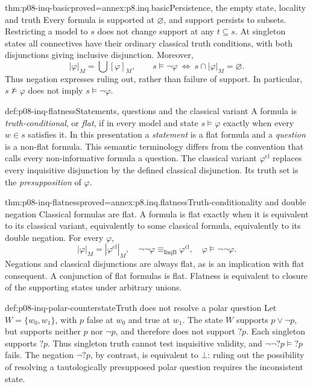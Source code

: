 \begin{hblemma}{thm:p08-inq-basic}{proved=annex:p8.inq.basic}{Persistence, the empty state, locality and truth}
Every formula is supported at \(\varnothing\), and support persists to subsets.
Restricting a model to \(s\) does not change support at any \(t\subseteq s\).
At singleton states all connectives have their ordinary classical truth
conditions, with both disjunctions giving inclusive disjunction.
Moreover,
\[
 |\varphi|_M=\bigcup[\varphi]_M,
 \qquad
 s\models\neg\varphi\ \Longleftrightarrow\ s\cap|\varphi|_M=\varnothing.
\]
Thus negation expresses ruling out, rather than failure of support. In
particular, \(s\not\models\varphi\) does not imply
\(s\models\neg\varphi\).
\end{hblemma}

\begin{hbdefinition}{def:p08-inq-flatness}{Statements, questions and the classical variant}
A formula is \emph{truth-conditional}, or \emph{flat}, if in every model and state
\(s\models\varphi\) exactly when every \(w\in s\) satisfies it.
In this presentation a \emph{statement} is a flat formula and a
\emph{question} is a non-flat formula. This semantic terminology differs
from the convention that calls every non-informative formula a question.
The classical variant \(\varphi^{\mathrm{cl}}\) replaces every inquisitive
disjunction by the defined classical disjunction. Its truth set is the
\emph{presupposition} of \(\varphi\).
\end{hbdefinition}

\begin{hblemma}{thm:p08-inq-flatness}{proved=annex:p8.inq.flatness}{Truth-conditionality and double negation}
Classical formulas are flat. A formula is flat exactly when it is equivalent
to its classical variant, equivalently to some classical formula, equivalently
to its double negation. For every \(\varphi\),
\[
 |\varphi|_M=|\varphi^{\mathrm{cl}}|_M,
 \quad\neg\neg\varphi\equiv_{\mathrm{InqB}}\varphi^{\mathrm{cl}},
 \quad\varphi\models\neg\neg\varphi.
\]
Negations and classical disjunctions are always flat, as is an implication
with flat consequent. A conjunction of flat formulas is flat. Flatness is
equivalent to closure of the supporting states under arbitrary unions.
\end{hblemma}

\begin{hbexample}{def:p08-inq-polar-counterstate}{Truth does not resolve a polar question}
Let \(W=\{w_0,w_1\}\), with \(p\) false at \(w_0\) and true at \(w_1\).
The state \(W\) supports \(p\lor\neg p\), but supports neither \(p\) nor
\(\neg p\), and therefore does not support \(?p\). Each singleton supports
\(?p\). Thus singleton truth cannot test inquisitive validity, and
\(\neg\neg?p\models?p\) fails. The negation \(\neg?p\), by contrast,
is equivalent to \(\bot\): ruling out the possibility of resolving a
tautologically presupposed polar question requires the inconsistent state.
\end{hbexample}

